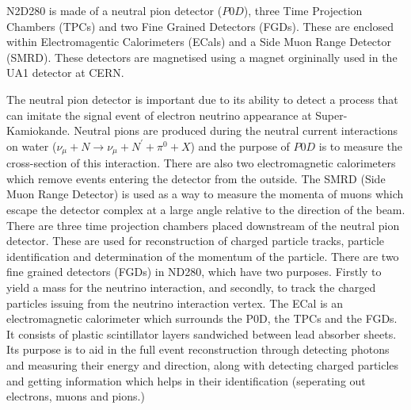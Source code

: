 N2D280 is made of a neutral pion detector ($P0D$), three Time Projection Chambers (TPCs) and two Fine Grained Detectors (FGDs). These are enclosed within Electromagentic Calorimeters (ECals) and a Side Muon Range Detector (SMRD). These detectors are magnetised using a magnet orgininally used in the UA1 detector at CERN. 

The neutral pion detector is important due to its ability to detect a process that can imitate the signal event of electron neutrino appearance at Super-Kamiokande. Neutral pions are produced during the neutral current interactions on water ($\nu_{\mu} + N \rightarrow \nu_{\mu} + N^{'} +\pi^{0} + X$) and the purpose of $P0D$ is to measure the cross-section of this interaction. 
\newline 
 There are also two electromagnetic calorimeters which remove events entering the detector from the outside. The SMRD (Side Muon Range Detector) is used as a way to measure the momenta of muons which escape the detector complex at a large angle relative to the direction of the beam. 
\newline
There are three time projection chambers placed downstream of the neutral pion detector. These are used for reconstruction of charged particle tracks, particle identification and determination of the momentum of the particle. There are two fine grained detectors (FGDs) in ND280, which have two purposes. Firstly to yield a mass for the neutrino interaction, and secondly, to track the charged particles issuing from the neutrino interaction vertex.
\newline
The ECal is an electromagnetic calorimeter which surrounds the P0D, the TPCs and the FGDs. It consists of plastic scintillator layers sandwiched between lead absorber sheets. Its purpose is to aid in the full event reconstruction through detecting photons and measuring their energy and direction, along with detecting charged particles and getting information which helps in their identification (seperating out electrons, muons and pions.)
